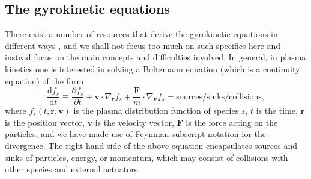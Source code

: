 \subsection*{The gyrokinetic equations}
\label{subsec: Gyrokinetic equations}
There exist a number of resources that derive the gyrokinetic equations in different ways \cite{dubin1983nonlinear,hahm1988nonlinear,brizard2007foundations,parra2011phase,krommes2012gyrokinetic,burby2015hamiltonian}, and we shall not focus too much on such specifics here and instead focus on the main concepts and difficulties involved. In general, in plasma kinetics one is interested in solving a Boltzmann equation (which is a continuity equation) of the form
\begin{equation}
    \frac{\mathrm{d} f_s}{\mathrm{d} t} \equiv \frac{\partial f_s}{\partial t} + \boldsymbol{v} \cdot \nabla_{\boldsymbol{r}} f_s + \frac{\boldsymbol{F}}{m} \cdot \nabla_{\boldsymbol{v}} f_s = \mathrm{sources/sinks/collisions},
\end{equation}
where $f_s(t,\boldsymbol{r},\boldsymbol{v})$ is the plasma distribution function of species $s$, $t$ is the time, $\boldsymbol{r}$ is the position vector, $\boldsymbol{v}$ is the velocity vector, $\boldsymbol{F}$ is the force acting on the particles, and we have made use of Feynman subscript notation for the divergence. The right-hand side of the above equation encapsulates sources and sinks of particles, energy, or momentum, which may consist of collisions with other species and external actuators. \par 

